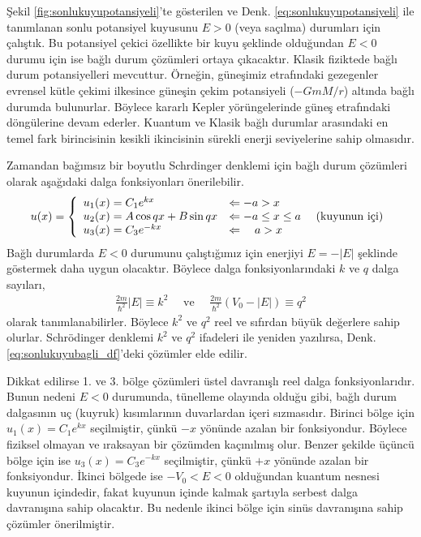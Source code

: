 \documentclass[00_kitap.tex]{subfiles}
\begin{document}
Şekil \ref{fig:sonlukuyupotansiyeli}'te gösterilen ve Denk. \ref{eq:sonlukuyupotansiyeli} ile tanımlanan sonlu potansiyel kuyusunu $E>0$ (veya saçılma) durumları için çalıştık. Bu potansiyel çekici özellikte bir kuyu şeklinde olduğundan $E<0$ durumu için ise bağlı durum çözümleri ortaya çıkacaktır. Klasik fiziktede bağlı durum potansiyelleri mevcuttur. Örneğin, güneşimiz etrafındaki gezegenler evrensel kütle çekimi ilkesince güneşin çekim potansiyeli ($-G m M/r$) altında bağlı durumda bulunurlar. Böylece kararlı Kepler yörüngelerinde güneş etrafındaki döngülerine devam ederler. Kuantum ve Klasik bağlı durumlar arasındaki en temel fark birincisinin kesikli ikincisinin sürekli enerji seviyelerine sahip olmasıdır.

Zamandan bağımsız bir boyutlu Schrdinger denklemi için bağlı durum çözümleri olarak aşağıdaki dalga fonksiyonları önerilebilir.
\begin{align}
u ( x )  = \left\{ 
\begin{array} { l l } 
{u_1(x) = C_1 e^{ k x} } & {\Leftarrow -a > x } \\
{u_2(x) = A \cos q x + B \sin q x } & {\Leftarrow -a \leq x \leq a } \quad \text{ (kuyunun içi)} \\
{u_3(x) = C_3 e^{- k x}} & {\Leftarrow \quad a > x }
\end{array} \right. 
\label{eq:sonlukuyubagli_df}
\end{align}
Bağlı durumlarda $E<0$ durumunu çalıştığımız için enerjiyi $E = -|E|$ şeklinde göstermek daha uygun olacaktır. Böylece dalga fonksiyonlarındaki $k$ ve $q$ dalga sayıları,
\begin{align}
\frac{2 m }{\hbar^{2}} |E| \equiv k^{2} \quad
\text{ ve } \quad \frac{2 m }{\hbar^{2}} (V_0-|E|) \equiv q^{2}
\end{align}
olarak tanımlanabilirler. Böylece $k^2$ ve $q^2$ reel ve sıfırdan büyük değerlere sahip olurlar. Schrödinger denklemi $k^2$ ve $q^2$ ifadeleri ile yeniden yazılırsa, Denk. \ref{eq:sonlukuyubagli_df}'deki çözümler elde edilir. 

Dikkat edilirse 1. ve 3. bölge çözümleri üstel davranışlı reel dalga fonksiyonlarıdır. Bunun nedeni $E<0$ durumunda, tünelleme olayında olduğu gibi, bağlı durum dalgasının uç (kuyruk) kısımlarının duvarlardan içeri sızmasıdır. Birinci bölge için ${u_1(x) = C_1 e^{ k x} }$ seçilmiştir, çünkü $-x$ yönünde azalan bir fonksiyondur. Böylece fiziksel olmayan ve ıraksayan bir çözümden kaçınılmış olur. Benzer şekilde üçüncü bölge için ise ${u_3(x) = C_3 e^{ -k x} }$ seçilmiştir, çünkü $+x$ yönünde azalan bir fonksiyondur. İkinci bölgede ise $-V_0<E<0$ olduğundan kuantum nesnesi kuyunun içindedir, fakat kuyunun içinde kalmak şartıyla serbest dalga davranışına sahip olacaktır. Bu nedenle ikinci bölge için sinüs davranışına sahip çözümler önerilmiştir.
\end{document}
